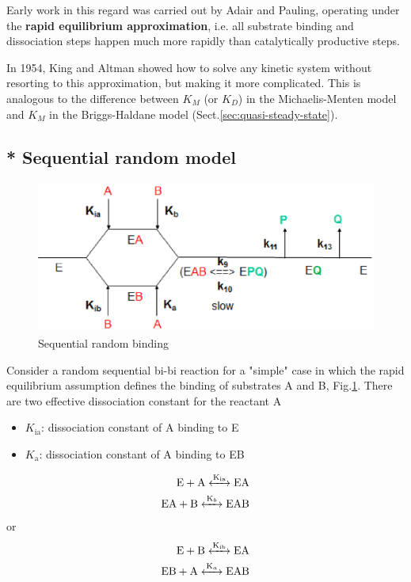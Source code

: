 Early work in this regard was carried out by Adair and Pauling, operating under
the {\bf rapid equilibrium approximation}, i.e. 
all substrate binding and dissociation steps happen much more rapidly than
catalytically productive steps.

In 1954, King and Altman showed how to solve any kinetic system without
resorting to this approximation, but making it more complicated.
This is analogous to the difference between $K_M$ (or $K_D$) in the
Michaelis-Menten model and $K_M$ in the Briggs-Haldane model
(Sect.\ref{sec:quasi-steady-state}).


\subsection{* Sequential random model}
\label{sec:sequential-random-models}

\begin{figure}[htb]
  \centerline{\includegraphics[height=5cm]{./images/sequential-random-binding.eps}}
  \caption{Sequential random binding}\label{fig:sequential-random-binding}
\end{figure}

Consider a random sequential bi-bi reaction for a "simple" case in which the
rapid equilibrium assumption defines the binding of substrates A and B,
Fig.\ref{fig:sequential-random-binding}. There are two effective dissociation
constant for the reactant A
\begin{itemize}
  \item $K_\text{ia}$: dissociation constant of A binding to E
  
  \item $K_\text{a}$: dissociation constant of A binding to EB
\end{itemize}

\begin{equation}
\begin{split}
\ce{E + A <->[K_{ia}] EA } \\
\ce{EA + B <->[K_b] EAB}
\end{split}
\end{equation}
or
\begin{equation}
\begin{split}
\ce{E + B <->[K_{ib}] EA } \\
\ce{EB + A <->[K_a] EAB}
\end{split}
\end{equation}

